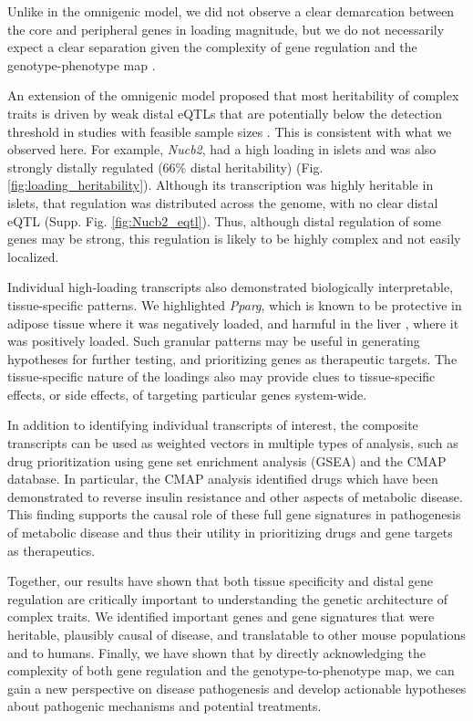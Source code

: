 \documentclass[
]{article}
\begin{document}
Unlike in the omnigenic model, we did not observe a clear demarcation
between the core and peripheral genes in loading magnitude, but we do
not necessarily expect a clear separation given the complexity of gene
regulation and the genotype-phenotype map \cite{pmid29906445}.

An extension of the omnigenic model proposed that most heritability of
complex traits is driven by weak distal eQTLs that are potentially below
the detection threshold in studies with feasible sample sizes
\cite{pmid31051098}. This is consistent with what we observed here. For
example, \textit{Nucb2}, had a high loading in islets and was also
strongly distally regulated (66\% distal heritability) (Fig.
\ref{fig:loading_heritability}). Although its transcription was highly
heritable in islets, that regulation was distributed across the genome,
with no clear distal eQTL (Supp. Fig. \ref{fig:Nucb2_eqtl}). Thus,
although distal regulation of some genes may be strong, this regulation
is likely to be highly complex and not easily localized.

Individual high-loading transcripts also demonstrated biologically
interpretable, tissue-specific patterns. We highlighted \textit{Pparg},
which is known to be protective in adipose tissue \cite{pmid17389767}
where it was negatively loaded, and harmful in the liver
\cite{pmid12805374, pmid12618528, 
pmid16357043, pmid15644454, pmid16403437}, where it was positively
loaded. Such granular patterns may be useful in generating hypotheses
for further testing, and prioritizing genes as therapeutic targets. The
tissue-specific nature of the loadings also may provide clues to
tissue-specific effects, or side effects, of targeting particular genes
system-wide.

In addition to identifying individual transcripts of interest, the
composite transcripts can be used as weighted vectors in multiple types
of analysis, such as drug prioritization using gene set enrichment
analysis (GSEA) and the CMAP database. In particular, the CMAP analysis
identified drugs which have been demonstrated to reverse insulin
resistance and other aspects of metabolic disease. This finding supports
the causal role of these full gene signatures in pathogenesis of
metabolic disease and thus their utility in prioritizing drugs and gene
targets as therapeutics.

Together, our results have shown that both tissue specificity and distal
gene regulation are critically important to understanding the genetic
architecture of complex traits. We identified important genes and gene
signatures that were heritable, plausibly causal of disease, and
translatable to other mouse populations and to humans. Finally, we have
shown that by directly acknowledging the complexity of both gene
regulation and the genotype-to-phenotype map, we can gain a new
perspective on disease pathogenesis and develop actionable hypotheses
about pathogenic mechanisms and potential treatments.
\end{document}
